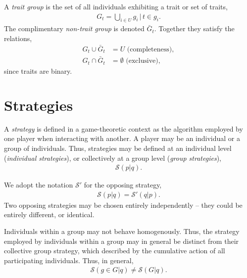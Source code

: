 \documentclass[twocolumn, aps, rmp, amsmath, amssymb, nofootinbib, superscriptaddress, longbibliography, floatfix, table-of-contents, eqsecnum]{revtex4-1}
\begin{document}
A \textit{trait group} is the set of all individuals exhibiting a trait or set of traits,
\begin{align}
	G_t = \bigcup_{i\in U} g_i \,|\, t\in g_i.
\end{align}
The complimentary \textit{non-trait group} is denoted $\bar G_t$. Together they satisfy the relations,
\begin{align}
G_t \cup \bar G_t &= U \,\,\text{(completeness)},\nonumber\\
G_t \cap \bar G_t &= \emptyset \,\,\text{(exclusive)},
\end{align}
since traits are binary.

\section{Strategies}

A \textit{strategy} is defined in a game-theoretic context as the algorithm employed by one player when interacting with another. A player may be an individual or a group of individuals. Thus, strategies may be defined at an individual level (\textit{individual strategies}), or collectively at a group level (\textit{group strategies}),
\begin{align}
	\mathcal{S}(p|q).	
\end{align}


We adopt the notation $\mathcal{S}'$ for the opposing strategy,
\begin{align}
	\mathcal{S}(p|q) = \mathcal{S}'(q|p).
\end{align}
Two opposing strategies may be chosen entirely independently -- they could be entirely different, or identical.

Individuals within a group may not behave homogenously. Thus, the strategy employed by individuals within a group may in general be distinct from their collective group strategy, which described by the cumulative action of all participating individuals. Thus, in general,
\begin{align}
	\mathcal{S}(g\in G|q)\neq \mathcal{S}(G|q).
\end{align}
\end{document}
